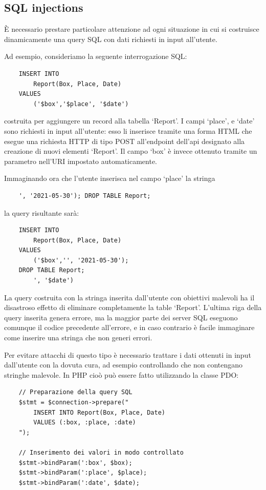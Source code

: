 \subsection{SQL injections}

È necessario prestare particolare attenzione ad ogni situazione in cui si costruisce dinamicamente una query SQL con dati richiesti in input all'utente.

Ad esempio, consideriamo la seguente interrogazione SQL:
\lstset{language=sql}
\begin{lstlisting}
    INSERT INTO
        Report(Box, Place, Date) 
    VALUES 
        ('$box','$place', '$date')
\end{lstlisting}
costruita per aggiungere un record alla tabella `Report'. I campi `\textdollar place', e `\textdollar date' sono richiesti in input all'utente: esso li inserisce tramite una forma HTML che esegue una richiesta HTTP di tipo POST all'endpoint dell'api designato alla creazione di nuovi elementi `Report'. Il campo `\textdollar box' è invece ottenuto tramite un parametro nell'URI impostato automaticamente.

Immaginando ora che l'utente inserisca nel campo `\textdollar place' la stringa
\begin{verbatim}
    ', '2021-05-30'); DROP TABLE Report;
\end{verbatim}
la query risultante sarà:
\lstset{language=sql, showstringspaces=false}
\begin{lstlisting}
    INSERT INTO
        Report(Box, Place, Date) 
    VALUES 
        ('$box','', '2021-05-30'); 
    DROP TABLE Report;
        ', '$date')
\end{lstlisting}

La query costruita con la stringa inserita dall'utente con obiettivi malevoli ha il disastroso effetto di eliminare completamente la table `Report'. L'ultima riga della query inserita genera errore, ma la maggior parte dei server SQL eseguono comunque il codice precedente all'errore, e in caso contrario è facile immaginare come inserire una stringa che non generi errori.

Per evitare attacchi di questo tipo è necessario trattare i dati ottenuti in input dall'utente con la dovuta cura, ad esempio controllando che non contengano stringhe malevole. In PHP cioò può essere fatto utilizzando la classe PDO:
\lstset{language=php}
\begin{lstlisting}
    // Preparazione della query SQL
    $stmt = $connection->prepare("
        INSERT INTO Report(Box, Place, Date)
        VALUES (:box, :place, :date)
    ");

    // Inserimento dei valori in modo controllato
    $stmt->bindParam(':box', $box);
    $stmt->bindParam(':place', $place);
    $stmt->bindParam(':date', $date);    
\end{lstlisting}

